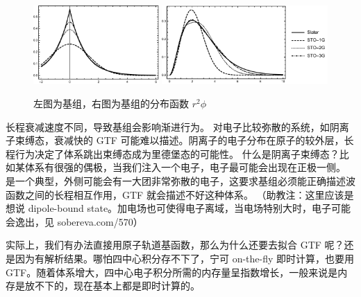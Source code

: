 \begin{figure}[tbp]
    \includegraphics[height=3cm]{fig/STO_vs_GTO.pdf}
    \includegraphics[height=3cm]{fig/STO_RDF.pdf}
    \caption{左图为基组，右图为基组的分布函数 $r^2\phi$}
    \label{fig:STO_GTO}
\end{figure}

长程衰减速度不同，导致基组会影响渐进行为。
对电子比较弥散的系统，如阴离子束缚态，衰减快的 GTF 可能难以描述。阴离子的电子分布在原子的较外层，长程行为决定了体系跳出束缚态成为里德堡态的可能性。
什么是阴离子束缚态？比如某体系有很强的偶极，当我们注入一个电子，电子最可能会出现在正极一侧。 是一个典型，外侧可能会有一大团非常弥散的电子，这要求基组必须能正确描述波函数之间的长程相互作用，GTF 就会描述不好这种体系。
（助教注：这里应该是想说 dipole-bound state。加电场也可使得电子离域，当电场特别大时，电子可能会逸出，见 sobereva.com/570）

实际上，我们有办法直接用原子轨道基函数，那么为什么还要去拟合 GTF 呢？还是因为有解析结果。哪怕四中心积分存不下了，宁可 on-the-fly 即时计算，也要用 GTF。随着体系增大，四中心电子积分所需的内存量呈指数增长，一般来说是内存是放不下的，现在基本上都是即时计算的。

